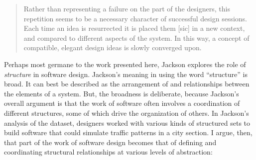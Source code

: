 \begin{quote}
Rather than representing a failure on the part of the designers, this repetition seems to be a necessary character of successful design sessions. Each time an idea is resurrected it is placed them {[}sic{]} in a new context, and compared to different aspects of the system. In this way, a concept of compatible, elegant design ideas is slowly converged upon. \citep[ p.~607]{baker_ideas_2010}
\end{quote}

Perhaps most germane to the work presented here, Jackson \citeyearpar{jackson_representing_2010} explores the role of \emph{structure} in software design. Jackson's meaning in using the word ``structure'' is broad. It can best be described as the arrangement of and relationships between the elements of a system. But, the broadness is deliberate, because Jackson's overall argument is that the work of software often involves a coordination of different structures, some of which drive the organization of others. In Jackson's \citeyearpar{jackson_representing_2010} analysis of the dataset, designers worked with various kinds of structured sets to build software that could simulate traffic patterns in a city section. I argue, then, that part of the work of software design becomes that of defining and coordinating structural relationships at various levels of abstraction:

